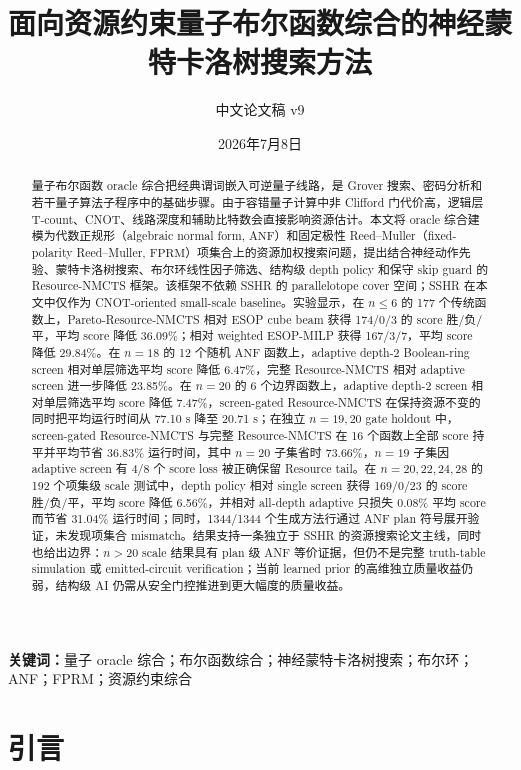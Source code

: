 \documentclass[UTF8,fontset=macnew,11pt]{ctexart}
\title{面向资源约束量子布尔函数综合的神经蒙特卡洛树搜索方法}
\author{中文论文稿 v9}
\date{2026年7月8日}
\newcommand{\method}{Resource-NMCTS}
\newcommand{\pareto}{Pareto-Resource-NMCTS}
\newcommand{\screen}{Boolean-ring screen}
\newcommand{\anf}{\ensuremath{\mathrm{ANF}}}
\newcommand{\fprm}{\ensuremath{\mathrm{FPRM}}}
\begin{document}
\pagestyle{plain}
\maketitle

\begin{abstract}
量子布尔函数 oracle 综合把经典谓词嵌入可逆量子线路，是 Grover 搜索、密码分析和若干量子算法子程序中的基础步骤。由于容错量子计算中非 Clifford 门代价高，逻辑层 T-count、CNOT、线路深度和辅助比特数会直接影响资源估计。本文将 oracle 综合建模为代数正规形（algebraic normal form, \anf{}）和固定极性 Reed--Muller（fixed-polarity Reed--Muller, \fprm{}）项集合上的资源加权搜索问题，提出结合神经动作先验、蒙特卡洛树搜索、布尔环线性因子筛选、结构级 depth policy 和保守 skip guard 的 \method{} 框架。该框架不依赖 SSHR 的 parallelotope cover 空间；SSHR 在本文中仅作为 CNOT-oriented small-scale baseline。实验显示，在 $n\leq6$ 的 177 个传统函数上，\pareto{} 相对 ESOP cube beam 获得 174/0/3 的 score 胜/负/平，平均 score 降低 36.09\%；相对 weighted ESOP-MILP 获得 167/3/7，平均 score 降低 29.84\%。在 $n=18$ 的 12 个随机 \anf{} 函数上，adaptive depth-2 \screen{} 相对单层筛选平均 score 降低 6.47\%，完整 \method{} 相对 adaptive screen 进一步降低 23.85\%。在 $n=20$ 的 6 个边界函数上，adaptive depth-2 screen 相对单层筛选平均 score 降低 7.47\%，screen-gated \method{} 在保持资源不变的同时把平均运行时间从 77.10 s 降至 20.71 s；在独立 $n=19,20$ gate holdout 中，screen-gated \method{} 与完整 \method{} 在 16 个函数上全部 score 持平并平均节省 36.83\% 运行时间，其中 $n=20$ 子集省时 73.66\%，$n=19$ 子集因 adaptive screen 有 4/8 个 score loss 被正确保留 Resource tail。在 $n=20,22,24,28$ 的 192 个项集级 scale 测试中，depth policy 相对 single screen 获得 169/0/23 的 score 胜/负/平，平均 score 降低 6.56\%，并相对 all-depth adaptive 只损失 0.08\% 平均 score 而节省 31.04\% 运行时间；同时，1344/1344 个生成方法行通过 ANF plan 符号展开验证，未发现项集合 mismatch。结果支持一条独立于 SSHR 的资源搜索论文主线，同时也给出边界：$n>20$ scale 结果具有 plan 级 ANF 等价证据，但仍不是完整 truth-table simulation 或 emitted-circuit verification；当前 learned prior 的高维独立质量收益仍弱，结构级 AI 仍需从安全门控推进到更大幅度的质量收益。
\end{abstract}

\noindent\textbf{关键词：}量子 oracle 综合；布尔函数综合；神经蒙特卡洛树搜索；布尔环；ANF；FPRM；资源约束综合

\section{引言}
\end{document}

